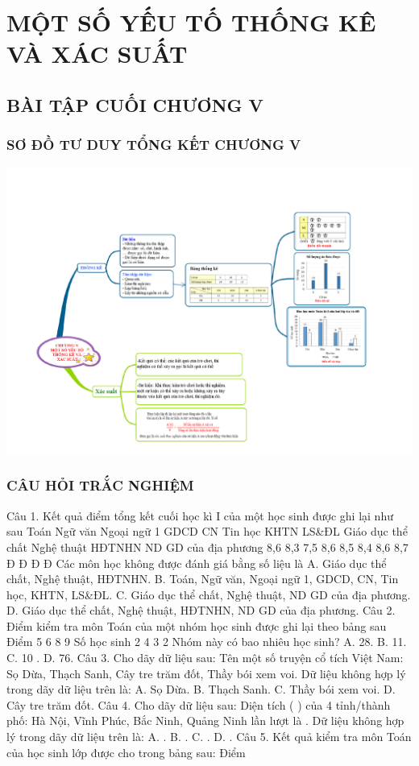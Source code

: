 \def\i{\item}
\graphicspath{{../pictures/c5/}}
\chapter{MỘT SỐ YẾU TỐ THỐNG KÊ VÀ XÁC SUẤT}
\section{BÀI TẬP CUỐI CHƯƠNG V}
\subsection{SƠ ĐỒ TƯ DUY TỔNG KẾT CHƯƠNG V}
\begin{center}
	\includegraphics[width=1.01\linewidth]{doc1}
\end{center}
\subsection{CÂU HỎI TRẮC NGHIỆM}
Câu 1. Kết quả điểm tổng kết cuối học kì I của một học sinh được ghi lại như sau
Toán	Ngữ văn	Ngoại ngữ 1	GDCD	CN	Tin học	KHTN	LS\&ĐL	Giáo dục thể chất	Nghệ thuật	HĐTNHN	ND GD của địa phương
8,6	8,3	7,5	8,6	8,5	8,4	8,6	8,7	Đ	Đ	Đ	Đ
Các môn học không được đánh giá bằng số liệu là
A.	Giáo dục thể chất, Nghệ thuật, HĐTNHN.
B.	Toán, Ngữ văn, Ngoại ngữ 1, GDCD, CN, Tin học, KHTN, LS\&ĐL.
C.	Giáo dục thể chất, Nghệ thuật, ND GD của địa phương.
D. Giáo dục thể chất, Nghệ thuật, HĐTNHN, ND GD của địa phương.
Câu 2. Điểm kiểm tra môn Toán của một nhóm học sinh được ghi lại theo bảng sau
Điểm	5	6	8	9
Số học sinh	2	4	3	2
Nhóm này có bao nhiêu học sinh?
A. 28.	B. 11.	C. 10 .	D. 76.
Câu 3. Cho dãy dữ liệu sau:
Tên một số truyện cổ tích Việt Nam: Sọ Dừa, Thạch Sanh, Cây tre trăm đốt, Thầy bói xem voi.  Dữ liệu không hợp lý trong dãy dữ liệu trên là:
A. Sọ Dừa.		 B. Thạch Sanh.	 C. Thầy bói xem voi.	         D. Cây tre trăm đốt.
Câu 4. Cho dãy dữ liệu sau:
Diện tích ( ) của 4 tỉnh/thành phố: Hà Nội, Vĩnh Phúc, Bắc Ninh, Quảng Ninh lần lượt là  . Dữ liệu không hợp lý trong dãy dữ liệu trên là:
A.  .		B.  .		C.  .	                     D.  .
Câu 5. Kết quả kiểm tra môn Toán của học sinh lớp   được cho trong bảng sau:
Điểm	  









